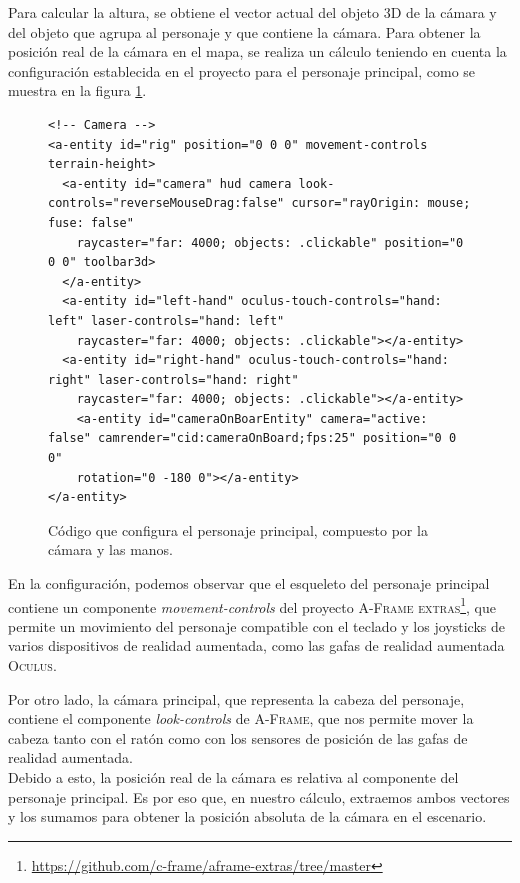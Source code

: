 \documentclass[a4paper, 11pt]{book}
\begin{document}
Para calcular la altura, se obtiene el vector actual del objeto 3D de la cámara y del objeto que agrupa al personaje y que contiene la cámara. Para obtener la posición real de la cámara en el mapa, se realiza un cálculo teniendo en cuenta la configuración establecida en el proyecto para el personaje principal, como se muestra en la figura \ref{codigo:rig}.\\
\begin{figure}[h]
\centering
\begin{verbatim}
<!-- Camera -->
<a-entity id="rig" position="0 0 0" movement-controls terrain-height>
  <a-entity id="camera" hud camera look-controls="reverseMouseDrag:false" cursor="rayOrigin: mouse; fuse: false"
    raycaster="far: 4000; objects: .clickable" position="0 0 0" toolbar3d>
  </a-entity>
  <a-entity id="left-hand" oculus-touch-controls="hand: left" laser-controls="hand: left"
    raycaster="far: 4000; objects: .clickable"></a-entity>
  <a-entity id="right-hand" oculus-touch-controls="hand: right" laser-controls="hand: right"
    raycaster="far: 4000; objects: .clickable"></a-entity>
    <a-entity id="cameraOnBoarEntity" camera="active: false" camrender="cid:cameraOnBoard;fps:25" position="0 0 0"
    rotation="0 -180 0"></a-entity>
</a-entity>
\end{verbatim}
\caption{Código que configura el personaje principal, compuesto por la cámara y las manos.
\label{codigo:rig}
}
\end{figure}
En la configuración, podemos observar que el esqueleto del personaje principal contiene un componente \emph{movement-controls} del proyecto \textsc{A-Frame extras}\footnote{\url{https://github.com/c-frame/aframe-extras/tree/master}}, que permite un movimiento del personaje compatible con el teclado y los joysticks de varios dispositivos de realidad aumentada, como las gafas de realidad aumentada \textsc{Oculus}.

Por otro lado, la cámara principal, que representa la cabeza del personaje, contiene el componente \emph{look-controls} de \textsc{A-Frame}, que nos permite mover la cabeza tanto con el ratón como con los sensores de posición de las gafas de realidad aumentada.\\
Debido a esto, la posición real de la cámara es relativa al componente del personaje principal. Es por eso que, en nuestro cálculo, extraemos ambos vectores y los sumamos para obtener la posición absoluta de la cámara en el escenario.
\end{document}
